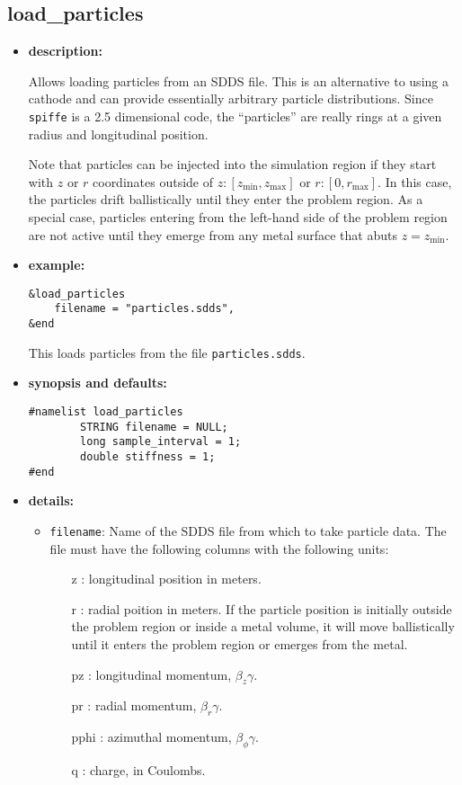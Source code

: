 %
\newpage

\subsection{load\_particles}

\begin{itemize}

\item {\bf description:}

Allows loading particles from an SDDS file.  This is an alternative to using
a cathode and can provide essentially arbitrary particle distributions.
Since \verb|spiffe| is a 2.5 dimensional code, the ``particles'' are really
rings at a given radius and longitudinal position.

Note that particles can be injected into the simulation region if they start with
$z$ or $r$ coordinates outside of $z:[z_{\textrm{min}}, z_{\textrm{max}}]$ 
or $r:[0, r_{\textrm{max}}]$. In this case, the particles drift ballistically until
they enter the problem region. As a special case, particles entering from the 
left-hand side of the problem region are not active until they emerge from
any metal surface that abuts $z=z_{\textrm{min}}$.

\item {\bf example:} 
\begin{verbatim}
&load_particles
    filename = "particles.sdds",
&end
\end{verbatim}
This loads particles from the file \verb|particles.sdds|.

\item {\bf synopsis and defaults:} 
\begin{verbatim}
#namelist load_particles
        STRING filename = NULL;
        long sample_interval = 1;
        double stiffness = 1;
#end
\end{verbatim}

\item {\bf details:}
\begin{itemize}
\item {\tt filename}: Name of the SDDS file from which to take particle data.
  The file must have the following columns with the following units:
  \begin{itemize}
    \item[z]: longitudinal position in meters. 
    \item[r]: radial poition in meters.  If the particle position is initially
       outside the problem region or inside a metal volume, it will move 
       ballistically until it enters the problem region or emerges from the metal.
    \item[pz]: longitudinal momentum, $\beta_z \gamma$.
    \item[pr]: radial momentum, $\beta_r \gamma$.
    \item[pphi]: azimuthal momentum, $\beta_\phi \gamma$.
    \item[q]: charge, in Coulombs.
    \end{itemize}


\end{itemize}
\end{itemize}
